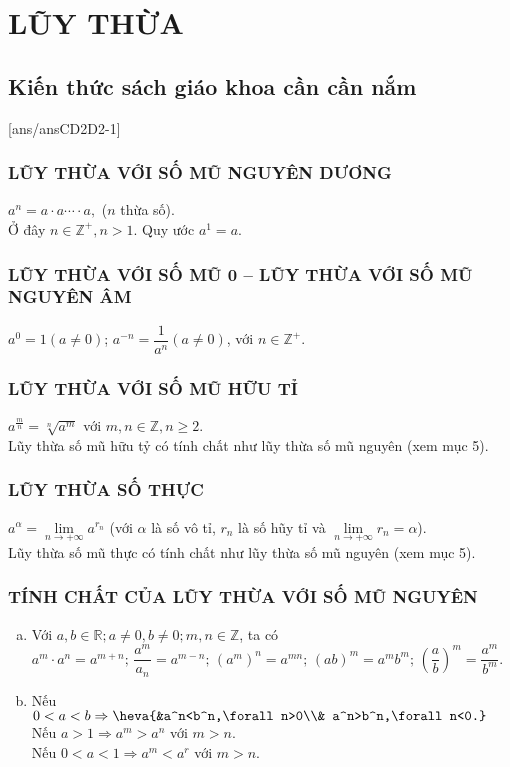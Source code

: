 \setcounter{chapter}{1}%
\section{LŨY THỪA}
\subsection{Kiến thức sách giáo khoa cần cần nắm}
[ans/ansCD2D2-1]
\subsubsection{LŨY THỪA VỚI SỐ MŨ NGUYÊN DƯƠNG}
\hspace*{5cm} $a^n=a\cdot a\cdots\cdot a,$ ($n$ thừa số).\\
Ở đây $n\in\mathbb{Z}^+, n>1$. Quy ước $a^1=a$.
\subsubsection{LŨY THỪA VỚI SỐ MŨ 0 – LŨY THỪA VỚI SỐ MŨ NGUYÊN ÂM}
\hspace*{5cm} $a^{0}=1(a\neq 0)$; $a^{-n}=\dfrac{1}{a^n}(a\neq 0)$, với $n\in\mathbb{Z}^+$.
\subsubsection{LŨY THỪA VỚI SỐ MŨ HỮU TỈ}
\hspace*{5cm} $a^{\tfrac{m}{n}}=\sqrt[n]{a^m} $ với $m,n \in \mathbb{Z}, n \geq 2.$\\
Lũy thừa số mũ hữu tỷ có tính chất như lũy thừa số mũ nguyên (xem mục 5).
\subsubsection{LŨY THỪA SỐ THỰC}
\hspace*{5cm}  $a^{\alpha}=\lim \limits_{n \to +\infty}a^{r_n}$ (với $\alpha$ là số vô tỉ, $r_n$ là số hũy tỉ và $\lim \limits_{n \to +\infty}r_n=\alpha$).\\
Lũy thừa số mũ thực có tính chất như lũy thừa số mũ nguyên (xem mục 5).
\subsubsection{TÍNH CHẤT CỦA LŨY THỪA VỚI SỐ MŨ NGUYÊN}
\begin{enumerate}[a)]
	\item Với $a,b \in \mathbb{R};a \neq 0,b \neq 0;m,n \in \mathbb{Z} $, ta có\\
	$a^m\cdot a^n=a^{m+n};\,\dfrac{a^m}{a_n}=a^{m-n};\,\left(a^m\right)^n=a^{mn};\,(ab)^m=a^mb^m;\,\left(\dfrac{a}{b}\right)^m=\dfrac{a^m}{b^m} $.
	\item Nếu $0<a<b \Rightarrow \heva{&a^n<b^n,\forall n>0\\& a^n>b^n,\forall n<0.} $\\
	Nếu $a>1\Rightarrow a^m>a^n$ với $m>n$.\\
	Nếu $0<a<1 \Rightarrow a^m<a^{r} $ với  $m>n$.
\end{enumerate}
